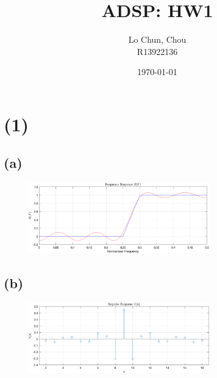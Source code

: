 \documentclass{article}
\title{ADSP: HW1}
\author{Lo Chun, Chou \\ R13922136}
\date\today
\begin{document}
\setlength{\parindent}{0pt}
\maketitle 

\section*{(1)}

\subsection*{(a)}

\begin{figure}[h]
    \centering
    \includegraphics[width=0.7\textwidth]{frequency_response}
\end{figure}

\subsection*{(b)}

\begin{figure}[h]
    \centering
    \includegraphics[width=0.7\textwidth]{impulse_response}
\end{figure}
\end{document}
